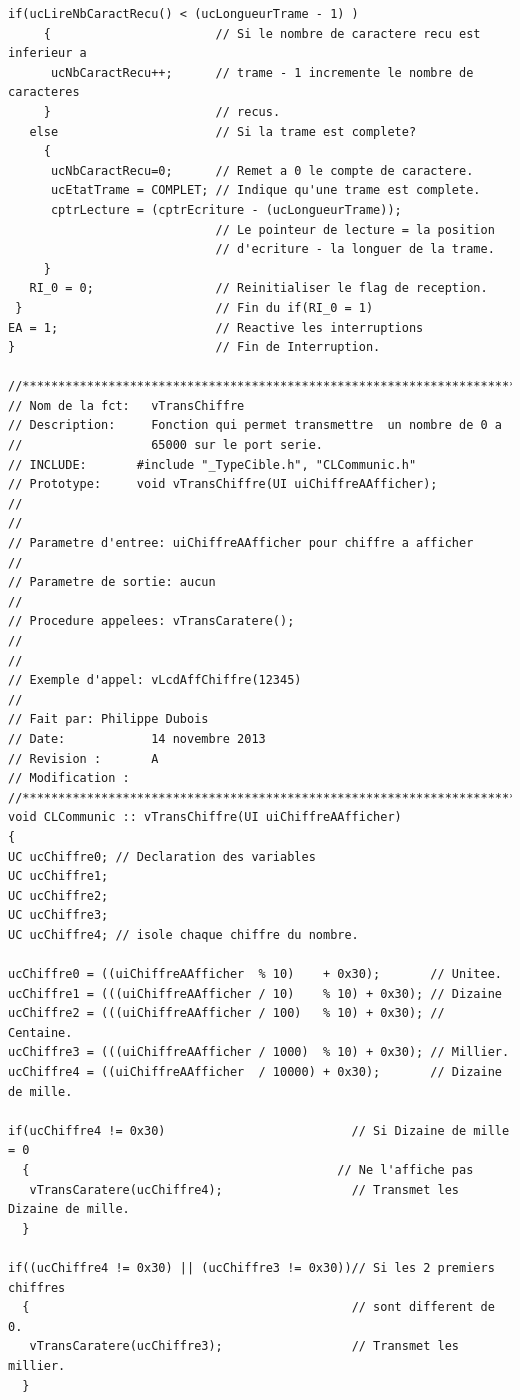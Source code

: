 \documentclass[10pt,a4paper,final]{article}
\begin{document}
\begin{lstlisting}[label={list:first},caption=Code source]
   if(ucLireNbCaractRecu() < (ucLongueurTrame - 1) )
     {                       // Si le nombre de caractere recu est inferieur a
      ucNbCaractRecu++;      // trame - 1 incremente le nombre de caracteres
     }                       // recus.
   else                      // Si la trame est complete?
     {
      ucNbCaractRecu=0;      // Remet a 0 le compte de caractere.
      ucEtatTrame = COMPLET; // Indique qu'une trame est complete.
      cptrLecture = (cptrEcriture - (ucLongueurTrame));
                             // Le pointeur de lecture = la position
                             // d'ecriture - la longuer de la trame.
     }
   RI_0 = 0;                 // Reinitialiser le flag de reception.
 }                           // Fin du if(RI_0 = 1)
EA = 1;                      // Reactive les interruptions
}                            // Fin de Interruption.

//*****************************************************************************
// Nom de la fct:   vTransChiffre
// Description:     Fonction qui permet transmettre  un nombre de 0 a
//                  65000 sur le port serie.
// INCLUDE:       #include "_TypeCible.h", "CLCommunic.h"
// Prototype:     void vTransChiffre(UI uiChiffreAAfficher);
//
//
// Parametre d'entree: uiChiffreAAfficher pour chiffre a afficher
//
// Parametre de sortie: aucun
//
// Procedure appelees: vTransCaratere();
//
//
// Exemple d'appel: vLcdAffChiffre(12345)
//
// Fait par: Philippe Dubois
// Date:            14 novembre 2013
// Revision :       A
// Modification :
//*****************************************************************************
void CLCommunic :: vTransChiffre(UI uiChiffreAAfficher)
{
UC ucChiffre0; // Declaration des variables
UC ucChiffre1;
UC ucChiffre2;
UC ucChiffre3;
UC ucChiffre4; // isole chaque chiffre du nombre.

ucChiffre0 = ((uiChiffreAAfficher  % 10)    + 0x30);       // Unitee.
ucChiffre1 = (((uiChiffreAAfficher / 10)    % 10) + 0x30); // Dizaine
ucChiffre2 = (((uiChiffreAAfficher / 100)   % 10) + 0x30); // Centaine.
ucChiffre3 = (((uiChiffreAAfficher / 1000)  % 10) + 0x30); // Millier.
ucChiffre4 = ((uiChiffreAAfficher  / 10000) + 0x30);       // Dizaine de mille.

if(ucChiffre4 != 0x30)                          // Si Dizaine de mille  = 0
  {                                           // Ne l'affiche pas
   vTransCaratere(ucChiffre4);                  // Transmet les Dizaine de mille.
  }

if((ucChiffre4 != 0x30) || (ucChiffre3 != 0x30))// Si les 2 premiers chiffres
  {                                             // sont different de 0.
   vTransCaratere(ucChiffre3);                  // Transmet les millier.
  }


\end{lstlisting}
\end{document}
